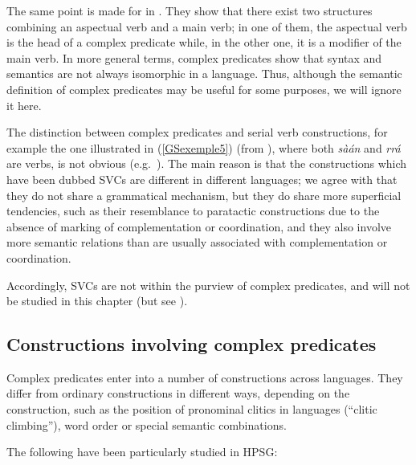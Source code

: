 \noindent
The same point is made for  in . They show that there exist two structures combining an aspectual verb and a main verb; in one of them, the aspectual verb is the head of a complex predicate while, in the other one, it is a modifier of the main verb. In more general terms, complex predicates show that syntax and semantics are not always isomorphic in a language. Thus, although the semantic definition of complex predicates may be useful for some purposes, we will ignore it here.

The distinction between complex predicates and serial verb constructions, for example the one illustrated in (\ref{GSexemple5}) (from \citealt[294]{MH2016}), where both \emph{sàán} and \emph{rrá} are verbs, is not obvious (e.g.\ \citealt{andrews1999complex, MH2016}). The main reason is that the constructions which have been dubbed SVCs are different in different languages; we agree with \citet{andrews1999complex} that they do not share a grammatical mechanism, but they do share more superficial tendencies, such as their resemblance to paratactic constructions due to the absence of marking of complementation or coordination, and they also involve more semantic relations than are usually associated with complementation or coordination.

\z

\noindent
Accordingly, SVCs are not within the purview of complex predicates, and will not be studied in this chapter (but see \citealt{lee14}).

\subsection{Constructions involving complex predicates}\label{GSsection1.2}

Complex predicates enter into a number of constructions across languages. They differ from ordinary constructions in different ways, depending on the construction, such as the position of pronominal clitics in  languages (``clitic climbing''), word order or special semantic combinations. 

The following have been particularly studied in HPSG:

